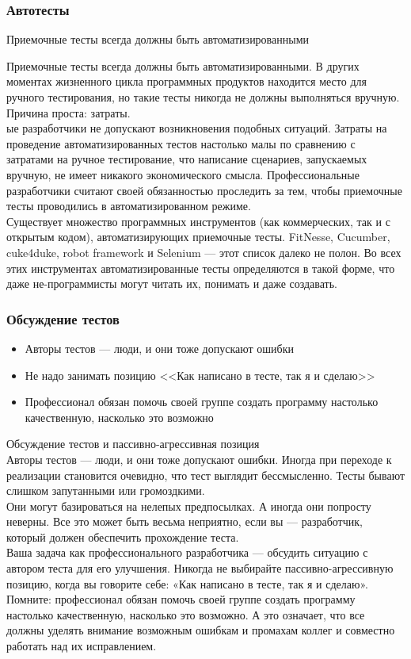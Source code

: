 \documentclass{../industrial-development}
\begin{document}
\begin{frame} \frametitle{Автотесты}
  \begin{block}{}
Приемочные тесты всегда должны быть автоматизированными
	\end{block}
\end{frame}
\lecturenotes
Приемочные тесты всегда должны быть автоматизированными. В других моментах жизненного цикла программных продуктов находится место для ручного тестирования, но такие тесты никогда не должны выполняться вручную. Причина проста: затраты.\\
ые разработчики не допускают возникновения подобных ситуаций. Затраты на проведение автоматизированных тестов настолько малы по сравнению с затратами на ручное тестирование, что написание сценариев, запускаемых вручную, не имеет никакого
экономического смысла. Профессиональные разработчики считают своей обязанностью проследить за тем, чтобы приемочные тесты проводились в автоматизированном режиме.\\
Существует множество программных инструментов (как коммерческих, так и с открытым кодом), автоматизирующих приемочные тесты. FitNesse, Cucumber, cuke4duke, robot framework и Selenium — этот список далеко не полон. Во всех этих инструментах автоматизированные тесты определяются в такой форме, что даже не-программисты могут
читать их, понимать и даже создавать.

\begin{frame} \frametitle{Обсуждение тестов}
\begin{itemize}
  \item Авторы тестов — люди, и они тоже допускают ошибки
  \item Не надо занимать позицию <<Как написано в тесте, так я и сделаю>>
	\item Профессионал обязан помочь своей группе создать программу
настолько качественную, насколько это возможно
\end{itemize}
\end{frame}
\lecturenotes
Обсуждение тестов и пассивно-агрессивная позиция\\
Авторы тестов — люди, и они тоже допускают ошибки. Иногда при переходе к реализации становится очевидно, что тест выглядит бессмысленно. Тесты бывают слишком запутанными или громоздкими.\\
Они могут базироваться на нелепых предпосылках. А иногда они попросту неверны. Все это может быть весьма неприятно, если вы — разработчик, который должен обеспечить прохождение теста.\\
Ваша задача как профессионального разработчика — обсудить ситуацию с автором теста для его улучшения. Никогда не выбирайте пассивно-агрессивную позицию, когда вы говорите себе: «Как написано в тесте, так я и сделаю».\\
Помните: профессионал обязан помочь своей группе создать программу настолько качественную, насколько это возможно. А это означает, что все должны уделять внимание возможным ошибкам и промахам коллег и совместно работать над их исправлением.
\end{document}
